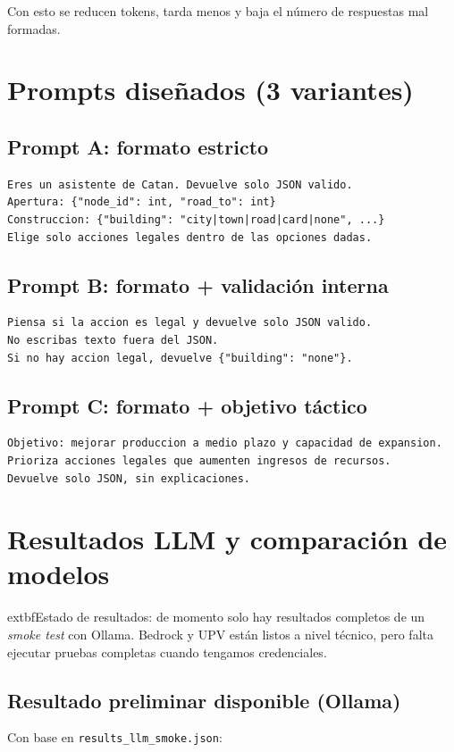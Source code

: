 \documentclass[11pt,spanish,listoffigures,listoftables]{tfgetsinf}
\begin{document}
Con esto se reducen tokens, tarda menos y baja el número de respuestas mal formadas.

\section{Prompts diseñados (3 variantes)}

\subsection{Prompt A: formato estricto}
\begin{lstlisting}
Eres un asistente de Catan. Devuelve solo JSON valido.
Apertura: {"node_id": int, "road_to": int}
Construccion: {"building": "city|town|road|card|none", ...}
Elige solo acciones legales dentro de las opciones dadas.
\end{lstlisting}

\subsection{Prompt B: formato + validación interna}
\begin{lstlisting}
Piensa si la accion es legal y devuelve solo JSON valido.
No escribas texto fuera del JSON.
Si no hay accion legal, devuelve {"building": "none"}.
\end{lstlisting}

\subsection{Prompt C: formato + objetivo táctico}
\begin{lstlisting}
Objetivo: mejorar produccion a medio plazo y capacidad de expansion.
Prioriza acciones legales que aumenten ingresos de recursos.
Devuelve solo JSON, sin explicaciones.
\end{lstlisting}

\section{Resultados LLM y comparación de modelos}
	extbf{Estado de resultados:} de momento solo hay resultados completos de un \textit{smoke test} con Ollama. Bedrock y UPV están listos a nivel técnico, pero falta ejecutar pruebas completas cuando tengamos credenciales.

\subsection{Resultado preliminar disponible (Ollama)}
Con base en \texttt{results\_llm\_smoke.json}:
\end{document}
